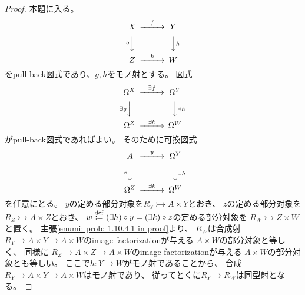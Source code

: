\documentclass[uplatex]{jsarticle}
\theoremstyle{definition}
\newcommand{\rtot}{\rightarrowtail}
\newcommand{\dfn}{\overset{\mathrm{\tiny def}}{\coloneqq}}
\begin{document}
\begin{proof}
  本題に入る。
  \[
  \begin{CD}
    X @> f >> Y \\
    @V g VV @VV h V \\
    Z @> k >> W
  \end{CD}
  \]
  をpull-back図式であり、\(g,h\)をモノ射とする。
  図式
  \[
  \begin{CD}
    \Omega^X @> \exists f >> \Omega^Y \\
    @V \exists g VV @VV \exists h V \\
    \Omega^Z @> \exists k >> \Omega^W
  \end{CD}
  \]
  がpull-back図式であればよい。
  そのために可換図式
  \[
  \begin{CD}
    A @> y >> \Omega^Y \\
    @V z VV @VV \exists h V \\
    \Omega^Z @> \exists k >> \Omega^W
  \end{CD}
  \]
  を任意にとる。
  \(y\)の定める部分対象を\(R_Y\rtot A\times Y\)とおき、
  \(z\)の定める部分対象を\(R_Z\rtot A\times Z\)とおき、
  \(w \dfn (\exists h)\circ y = (\exists k)\circ z\)の定める部分対象を
  \(R_W \rtot Z\times W\)と置く。
  主張\ref{enumi: prob: 1.10.4.1 in proof}より、
  \(R_W\)は合成射
  \(R_Y\to A\times Y\to A\times W\)のimage factorizationが与える
  \(A\times W\)の部分対象と等しく、
  同様に
  \(R_Z\to A\times Z \to A\times W\)のimage factorizationが与える
  \(A\times W\)の部分対象とも等しい。
  ここで\(h:Y\to W\)がモノ射であることから、
  合成\(R_Y\to A\times Y \to A\times W\)はモノ射であり、
  従ってとくに\(R_Y\to R_W\)は同型射となる。


\end{proof}
\end{document}
